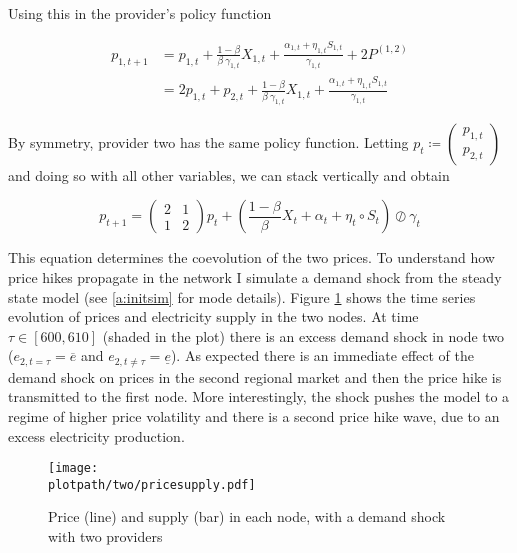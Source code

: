 Using this in the provider's policy function

\begin{equation*}
  \begin{split}
    p_{1, t+1} &= p_{1, t} + \frac{1-\beta}{\beta \ \gamma_{1, t}} X_{1, t} + \frac{\alpha_{1, t} + \eta_{1, t} S_{1, t}}{\gamma_{1, t}} + 2P^{(1, 2)} \\
    &= 2p_{1, t} + p_{2, t} + \frac{1-\beta}{\beta \ \gamma_{1, t}} X_{1, t} + \frac{\alpha_{1, t} + \eta_{1, t} S_{1, t}}{\gamma_{1, t}}
  \end{split}
\end{equation*}

By symmetry, provider two has the same policy function. Letting $p_t \coloneqq \begin{pmatrix}
    p_{1, t} \\ p_{2, t}
  \end{pmatrix}$ and doing so with all other variables, we can stack vertically and obtain

\begin{equation}
  p_{t+1} = \begin{pmatrix}
    2 & 1 \\
    1 & 2
  \end{pmatrix} p_t + \left( \frac{1-\beta}{\beta} X_t + \alpha_t + \eta_t \circ S_t \right) \oslash \gamma_t
\end{equation}

This equation determines the coevolution of the two prices. To understand how price hikes propagate in the network I simulate a demand shock from the steady state model (see \ref{a:initsim} for mode details). Figure \ref{fig:two} shows the time series evolution of prices and electricity supply in the two nodes. At time $\tau \in [600, 610]$ (shaded in the plot) there is an excess demand shock in node two ($e_{2, t = \tau} = \overline{e}$ and $e_{2, t \neq \tau} = \underline{e}$). As expected there is an immediate effect of the demand shock on prices in the second regional market and then the price hike is transmitted to the first node. More interestingly, the shock pushes the model to a regime of higher price volatility and there is a second price hike wave, due to an excess electricity production.


\begin{figure}[H]
  \centering
  \texttt{[image: \\plotpath/two/pricesupply.pdf]}
  \caption{Price (line) and supply (bar) in each node, with a demand shock with two providers} \label{fig:two}
\end{figure}

